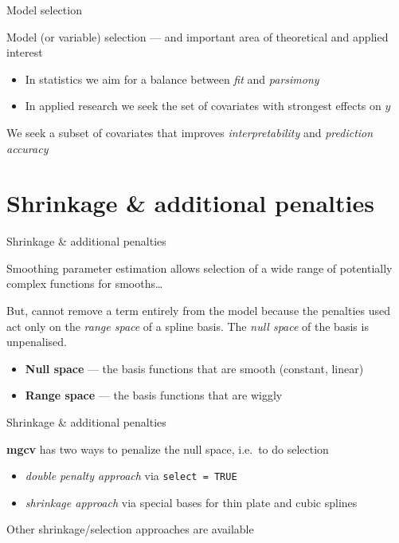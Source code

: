 \documentclass[10pt,ignorenonframetext,compress, aspectratio=169]{beamer}
\providecommand{\tightlist}{%
  \setlength{\itemsep}{0pt}\setlength{\parskip}{0pt}}
\begin{document}
\begin{frame}{Model selection}

Model (or variable) selection --- and important area of theoretical and
applied interest

\begin{itemize}
\tightlist
\item
  In statistics we aim for a balance between \emph{fit} and
  \emph{parsimony}
\item
  In applied research we seek the set of covariates with strongest
  effects on \(y\)
\end{itemize}

We seek a subset of covariates that improves \emph{interpretability} and
\emph{prediction accuracy}

\end{frame}

\section{Shrinkage \& additional
penalties}\label{shrinkage-additional-penalties}

\begin{frame}{Shrinkage \& additional penalties}

Smoothing parameter estimation allows selection of a wide range of
potentially complex functions for smooths\ldots{}

But, cannot remove a term entirely from the model because the penalties
used act only on the \emph{range space} of a spline basis. The
\emph{null space} of the basis is unpenalised.

\begin{itemize}
\tightlist
\item
  \textbf{Null space} --- the basis functions that are smooth (constant,
  linear)
\item
  \textbf{Range space} --- the basis functions that are wiggly
\end{itemize}

\end{frame}

\begin{frame}[fragile]{Shrinkage \& additional penalties}

\textbf{mgcv} has two ways to penalize the null space, i.e.~to do
selection

\begin{itemize}
\tightlist
\item
  \emph{double penalty approach} via \texttt{select\ =\ TRUE}
\item
  \emph{shrinkage approach} via special bases for thin plate and cubic
  splines
\end{itemize}

Other shrinkage/selection approaches are available

\end{frame}
\end{document}
